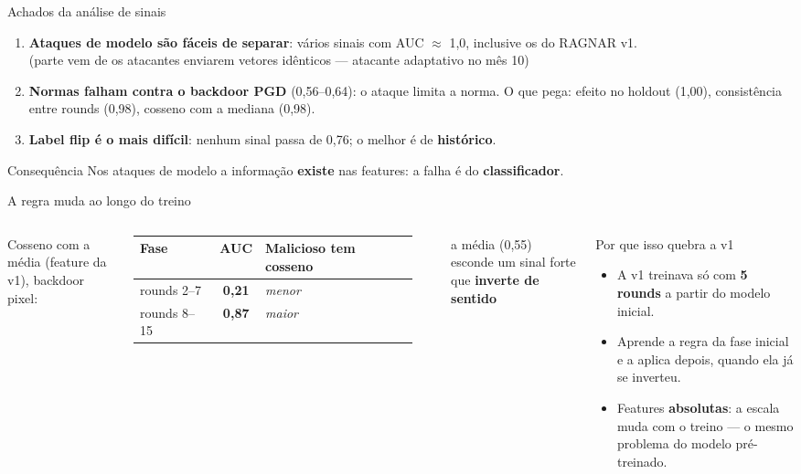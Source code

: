 \documentclass[aspectratio=169,11pt,xcolor=table]{beamer}
\begin{document}
\begin{frame}{Achados da análise de sinais}
  \begin{enumerate}
    \item \textbf{Ataques de modelo são fáceis de separar}: vários sinais com AUC $\approx$ 1,0, inclusive os do RAGNAR v1.\\
      {\footnotesize (parte vem de os atacantes enviarem vetores idênticos --- atacante adaptativo no mês 10)}
    \item \textbf{Normas falham contra o backdoor PGD} (0,56--0,64): o ataque limita a norma. O que pega: efeito no holdout (1,00), consistência entre rounds (0,98), cosseno com a mediana (0,98).
    \item \textbf{Label flip é o mais difícil}: nenhum sinal passa de 0,76; o melhor é de \textbf{histórico}.
  \end{enumerate}
  \vspace{0.3em}
  \begin{block}{Consequência}
    Nos ataques de modelo a informação \textbf{existe} nas features: a falha é do \textbf{classificador}.
  \end{block}
\end{frame}

\begin{frame}{A regra muda ao longo do treino}
  \begin{columns}[c]
    Cosseno com a média (feature da v1), backdoor pixel:\\[0.6em]
    \centering\small
    \begin{tabular}{lcl}
      \toprule
      Fase & AUC & Malicioso tem cosseno \\
      \midrule
      rounds 2--7 & \textbf{0,21} & \emph{menor} \\
      rounds 8--15 & \textbf{0,87} & \emph{maior} \\
      \bottomrule
    \end{tabular}\\[0.4em]
    \raggedright\footnotesize a média (0,55) esconde um sinal forte que \textbf{inverte de sentido}
    \begin{alertblock}{Por que isso quebra a v1}
      \begin{itemize}
        \item A v1 treinava só com \textbf{5 rounds} a partir do modelo inicial.
        \item Aprende a regra da fase inicial e a aplica depois, quando ela já se inverteu.
        \item Features \textbf{absolutas}: a escala muda com o treino --- o mesmo problema do modelo pré-treinado.
      \end{itemize}
    \end{alertblock}
  \end{columns}
\end{frame}
\end{document}
